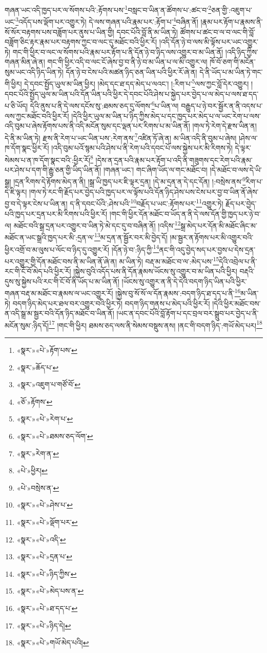གཞན་ཡང་འདི་ཁྱད་པར་ལ་སོགས་པའི་:རྟོགས་པས་\footnote{«སྣར་»«པེ་»རྟོག་པས་}བསླང་བ་ཡིན་ན་ཚོགས་པ་:ཚང་བ་\footnote{«སྣར་»ཆོད་པ་}ཅན་གྱི་:འཇུག་པ་ཡང་\footnote{«སྣར་»འཇུག་པ་གཙོ་བོ་}འདོད་པས་ལྡོག་པར་འགྱུར་ཏེ། དེ་ལས་གཞན་པའི་རྣམ་པར་:རྟོག་པ་\footnote{«ཅོ་»རྟོགས་}བཞིན་ནོ། །རྣམ་པར་རྟོག་པ་རྣམས་ནི་སོ་སོར་བརྟགས་པས་བཟློག་པར་ནུས་པ་ཡིན་གྱི། དབང་པོའི་བློ་ནི་མ་ཡིན་ཏེ། ཚོགས་པ་ཚང་བ་ལ་བ་ལང་གི་བློ་བཟློག་ཅིང་རྟར་རྣམ་པར་བརྟགས་ཀྱང་བ་ལང་དུ་མཐོང་བའི་ཕྱིར་རོ། །འདི་དོན་ཉེ་བ་ལས་མི་ལྟོས་པར་ཡང་འགྱུར་ཏེ། གང་གི་ཕྱིར་བ་ལང་ལ་སོགས་པའི་རྣམ་པར་རྟོག་པ་ནི་དོན་ཉེ་བ་ཉིད་ལས་འགྱུར་བ་མ་ཡིན་ནོ། །འདི་ཉིད་ཀྱིས་གཞན་མིན་ཞེ་ན། གང་གི་ཕྱིར་འདི་བ་ལང་ངོ་ཞེས་བྱ་བ་ནི་ཉེ་བ་མ་ཡིན་པ་ལ་མི་འགྱུར་ལ། ཁོ་བོ་ཅག་གི་མངོན་སུམ་ཡང་འདི་ཉིད་ཡིན་ཏེ། དོན་ཉེ་བ་ངེས་པའི་མཚན་ཉིད་ཅན་ཡིན་པའི་ཕྱིར་རོ་ཞེ་ན། དེ་ནི་ཡོད་པ་མ་ཡིན་ཏེ་གང་གི་ཕྱིར། དེ་དབང་སྤྱོད་ཡུལ་མ་ཡིན་ཕྱིར། །མེད་དང་ཐ་དད་མེད་པ་ལའང་། །:རིག་པ་\footnote{«སྣར་»«པེ་»རེག་པ་}ལས་ཀྱང་བློ་དེར་འགྱུར། །དབང་པོའི་སྤྱོད་ཡུལ་མ་ཡིན་པའི་དོན་ཡིན་པའི་ཕྱིར་དེ་དབང་པོའི་ཤེས་པ་སྐྱེད་པར་བྱེད་པ་ལ་མེད་པ་ལས་ཐ་དད་པ་ཅི་ཡོད། དེའི་ནུས་པ་ནི་དེ་ལས་དངོས་སུ་:ཐམས་ཅད་དུ་ལོགས་\footnote{«སྣར་»«པེ་»ཐམས་ཅད་ལོག་}པ་ཡིན་ལ། བརྒྱུད་པ་ཉེ་བར་སྦྱོར་ན་ནི་འདས་པ་ལས་ཀྱང་མཐོང་བའི་ཕྱིར་རོ། །དེའི་ཕྱིར་ཡུལ་མ་ཡིན་པ་ཉིད་ཀྱིས་མེད་པ་དང་ཁྱད་པར་མེད་པ་ལ་ཡང་རེག་པ་ལས་འདི་བུམ་པ་ཞེས་རྟོགས་པས་ནི་འདི་མངོན་སུམ་དང་ལྡན་པར་རིགས་པ་མ་ཡིན་ནོ། །གལ་ཏེ་རེག་དེ་རྫས་ཡིན་ན། དེ་ནི་མ་ཡིན་ཏེ། རྫས་ནི་རེག་པ་ཡང་ཡིན་པས་:རེག་ནས་\footnote{«སྣར་»རེག་ན་}འཛིན་ཏོ་ཞེ་ན། མ་ཡིན་འདི་ནི་བུམ་པ་ཞེས། །ཤེས་ལ་ཁ་དོག་སྣང་ཕྱིར་རོ། །འདི་བུམ་པའོ་སྙམ་པའི་ཤེས་པ་ནི་རེག་པའི་དབང་པོ་ལས་སྐྱེས་པར་མི་རིགས་ཏེ། དེ་ལྟར་སེམས་པ་ན་ཁ་དོག་སྣང་བའི་:ཕྱིར་རོ།\footnote{«པེ་»ཕྱིར།} །དེས་ན་དྲན་པའི་རྣམ་པར་རྟོག་པ་འདི་ནི་གཟུགས་དང་རེག་པའི་རྣམ་པར་ཤེས་པ་དག་གི་རྒྱུ་ཅན་གྱི་ཡིད་ཡིན་ནོ། །གཞན་ཡང་། གང་ཞིག་ཡོད་ལ་གང་མཐོང་བ། །དེ་མཐོང་བ་ལས་དེ་ཡི་སྒྲ། །དྲན་རིགས་དེ་རྟོགས་མེད་ན་ནི། །སྒྲ་ཡི་ཁྱད་པར་ཇི་ལྟར་དྲན། །དེ་མ་དྲན་ན་དེ་དང་དོན། །:བསྲེས་ནས་\footnote{«པེ་»བསྲེས་ན་}རིག་པ་དེ་ཇི་ལྟར། །གལ་ཏེ་རང་གི་རྗོད་པར་བྱེད་པའི་ཁྱད་པར་ལ་ལྟོས་པའི་དོན་ཉིད་ཤེས་པས་ངེས་པར་བྱ་བ་ཡིན་ནོ་ཞེས་བྱ་བ་དེ་ལྟར་ངེས་པ་ཡིན་ན། ད་ནི་དབང་པོའི་:ཤེས་པའི་\footnote{«སྣར་»«པེ་»ཤེས་པ་}བརྗོད་པ་ཡང་:རྟོགས་པར་\footnote{«སྣར་»«པེ་»ལྡོག་པར་}འགྱུར་ཏེ། རྗོད་པར་བྱེད་པའི་ཁྱད་པར་དྲན་པར་མི་རིགས་པའི་ཕྱིར་རོ། །གང་གི་ཕྱིར་དོན་མཐོང་བ་ཡོད་ན་ནི་དེ་ལས་དོན་གྱི་ཁྱད་པར་ཉེ་བ་ལ། མཐོང་བའི་སྒྲ་དྲན་པར་འགྱུར་བ་ཡིན་ཏེ་མེ་དང་དུ་བ་བཞིན་ནོ། །འདིས་\footnote{«སྣར་»«པེ་»འདི་}སྒྲ་མེད་པར་དོན་མི་མཐོང་ཞིང་མ་མཐོང་ན་ཡང་སྒྲའི་ཁྱད་པར་མི་:དྲན་ལ་\footnote{«སྣར་»«པེ་»དྲན་པ་}མ་དྲན་ན་སྦྱོར་བར་མི་བྱེད་དོ། །མ་སྦྱར་ན་རྟོགས་པར་མི་འགྱུར་བའི་ཕྱིར་འགྲོ་བ་མ་ལུས་པ་ལོང་བ་ཉིད་དུ་འགྱུར་རོ། །དོན་ཉེ་བ་:ཉིད་ཀྱི་\footnote{«སྣར་»«པེ་»ཉིད་ཀྱིས་}ནང་གི་འདུ་བྱེད་སད་པར་བྱས་པ་དེས་དྲན་པར་འགྱུར་གྱི་དོན་མཐོང་བས་ནི་མ་ཡིན་ནོ་ཞེ་ན། མ་ཡིན་ཏེ། བརྡ་མ་མཐོང་བ་ལ་:མེད་པས་\footnote{«སྣར་»«པེ་»མེད་པས་ན་}དེའི་འབྲེལ་པ་ནི་རང་གི་ངོ་བོ་མེད་པའི་ཕྱིར་རོ། །སྐྱེས་བུའི་འདོད་པས་ནི་དོན་རྣམས་ཡོངས་སུ་འགྱུར་བ་མ་ཡིན་པའི་ཕྱིར། བརྡའི་དུས་སུ་སྐྱེས་པའི་རང་གི་ངོ་བོ་ནི་ཡོད་པ་མ་ཡིན་ནོ། །ཡོངས་སུ་འགྱུར་ན་ནི་དེ་དེའི་བདག་ཉིད་ཡིན་པའི་ཕྱིར་གཞན་བརྡ་མ་མཐོང་བ་རྣམས་ལ་ཡང་འགྱུར་རོ། །སྐྱེས་བུ་སོ་སོ་ལ་དོན་རྣམས་:བདག་ཉིད་ཐ་དད་པ་ནི་\footnote{«སྣར་»«པེ་»ཐ་དད་པ་}མ་ཡིན་ཏེ། བདག་ཉིད་མེད་པར་ཐལ་བར་འགྱུར་བའི་ཕྱིར་ཏེ། བདག་ཉིད་གནས་པ་མེད་པའི་ཕྱིར་རོ། །དེའི་ཕྱིར་མཐོང་བས་ན་འདི་སྒྲ་མ་སྦྱར་བའི་དོན་ཉིད་མཐོང་བ་ཡིན་ནོ། །ཡང་ན་དབང་པོའི་བློ་རྟོག་པ་དང་བྲལ་བར་སྒྲུབ་པར་བྱེད་པ་ནི་མངོན་སུམ་:ཉིད་དོ།\footnote{«སྣར་»«པེ་»ཉིད་དེ།} །གང་གི་ཕྱིར། ཐམས་ཅད་ལས་ནི་སེམས་བསྡུས་ནས། །ནང་གི་བདག་ཉིད་:གཡོ་མེད་པར།\footnote{«སྣར་»«པེ་»གཡོ་མེད་པའི།} 